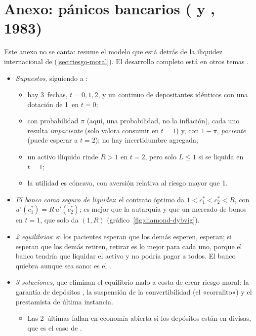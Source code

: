 \documentclass[11pt]{article}
\begin{document}
\section{Anexo: pánicos bancarios ( y , 1983)}\label{anexo:diamond-dybvig}

Este anexo no se canta: resume el modelo que está detrás de la iliquidez internacional de \textcite{ChangVelasco2001Model} (\ref{sec:riesgo-moral}). El desarrollo completo está en otros temas  .

\begin{itemize}
\item \emph{Supuestos}, siguiendo a \textcite{DiamondDybvig1983Bank}:
  \begin{itemize}
  \item hay 3~fechas, $t=0,1,2$, y un continuo de depositantes idénticos con una dotación de 1~en $t=0$;
  \item con probabilidad $\pi$ (aquí, una probabilidad, no la inflación), cada uno resulta \emph{impaciente} (solo valora consumir en $t=1$) y, con $1-\pi$, \emph{paciente} (puede esperar a $t=2$); no hay incertidumbre agregada;
  \item un activo ilíquido rinde $R>1$ en $t=2$, pero solo $L\le1$ si se liquida en $t=1$;
  \item la utilidad es cóncava, con aversión relativa al riesgo mayor que 1.
  \end{itemize}
\item \emph{El banco como seguro de liquidez}: el contrato óptimo da $1<c_1^*<c_2^*<R$, con $u'(c_1^*)=R\,u'(c_2^*)$; es mejor que la autarquía y que un mercado de bonos en $t=1$, que solo da $(1,R)$ (gráfico~\ref{fig:diamond-dybvig}).
\item \emph{2 equilibrios}: si los pacientes esperan que los demás esperen, esperan; si esperan que los demás retiren, retirar es lo mejor para cada uno, porque el banco tendría que liquidar el activo y no podría pagar a todos. El banco quiebra aunque sea sano: es el .
\item \emph{3 soluciones}, que eliminan el equilibrio malo a costa de crear riesgo moral: la garantía de depósitos , la suspensión de la convertibilidad (el «corralito») y el prestamista de última instancia.
  \begin{itemize}
  \item Las 2~últimas fallan en economía abierta si los depósitos están en divisas, que es el caso de \textcite{ChangVelasco2001Model}.

\end{itemize}
\end{itemize}
\end{document}
